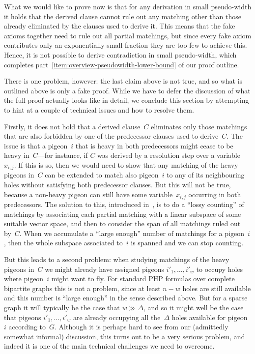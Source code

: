 \documentclass{article}
\newcommand{\clc}{\ensuremath{C}}
\newcommand{\fakeaxiomintro}{fake axiom\xspace}
\newcommand{\heavy}{heavy\xspace}
\newcommand{\GdegMax}{\Delta}
\newcommand{\gdegmax}{\GdegMax}
\newcommand{\pseudowidth}{pseudo-width\xspace}
\numberwithin{equation}{section}
\begin{document}
What we would like to prove now is that for any 
derivation
in small \pseudowidth it holds that
the derived clause cannot rule out any matching other than those
already 
eliminated
by the clauses used to derive it.
This means that the \fakeaxiomintro{}s together need to rule out all
partial matchings,
but since every \fakeaxiomintro contributes only an exponentially
small fraction 
they are too few
to achieve this. Hence, it
is not
possible to derive contradiction in small \pseudowidth,
which completes 
part~\ref{item:overview-pseudowidth-lower-bound} 
of our proof outline.

There is one problem, however: the last claim above is not true, and
so what is outlined above is only a fake proof. While we have to defer
the discussion of what the full proof actually looks like in detail,
we conclude this section by attempting to hint at a couple of
technical issues and how to resolve them.


Firstly, it does not hold that a derived clause~$\clc$ eliminates only
those matchings that are also forbidden by one of the predecessor clauses
used to derive~$\clc$.  The issue is that a pigeon~$i$ that is \heavy
in both predecessors might cease to be \heavy in~$\clc$---for
instance, if $\clc$ was derived by a resolution step over a
variable~$x_{i,j}$. If this is so, then we would need to show that any
matching of the \heavy pigeons in~$\clc$ can be extended to match
also pigeon~$i$ to any of its neighbouring holes without satisfying
both predecessor clauses. But this will not be true, because a
non-\heavy pigeon can still have some variable~$x_{i,j}$ occurring in both
predecessors. The solution to this, introduced
in~\cite{Razborov03ResolutionLowerBoundsWFPHP}, is to do a  
``lossy counting'' of matchings by associating each partial matching
with a linear subspace of some suitable vector space, and then 
to consider
the span of all matchings ruled out
by~$\clc$. When we accumulate a ``large enough'' number of matchings for a
pigeon~$i$, then the whole subspace associated to~$i$ is spanned and
we can stop counting.

But this leads to a second problem: when studying matchings of the
\heavy pigeons in~$\clc$ we might already have assigned pigeons
$i'_1, \ldots, i'_w$ to occupy holes where pigeon~$i$ might want to fly.  For standard PHP
formulas over complete bipartite graphs this is not a problem, since
at least $n - w$ holes are still available and this number is ``large
enough'' in the sense described above. But for a sparse graph it will
typically be the case that $w \gg \gdegmax$, and so it might well be
the case that
pigeons $i'_1, \ldots, i'_w$ 
are already occupying all the~$\gdegmax$ holes available for pigeon~$i$
according to~$G$. Although it is perhaps hard to see from our
(admittedly somewhat informal) discussion, this turns out to be a very
serious problem, and indeed it is one of the main technical challenges
we need to overcome.
\end{document}
